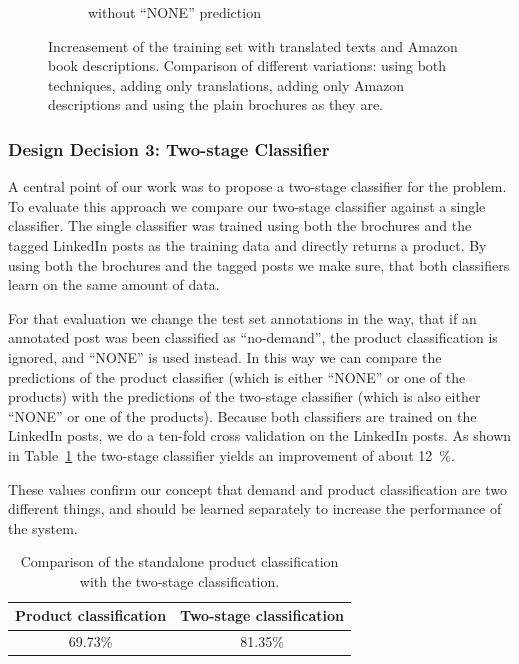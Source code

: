 \begin{figure}[h!]
\begin{subfigure}[t]{0.5\textwidth}
		\caption{without ``NONE'' prediction}
	\end{subfigure}
	\caption{Increasement of the training set with translated texts and Amazon book descriptions. Comparison of different variations: using both techniques, adding only translations, adding only Amazon descriptions and using the plain brochures as they are.}
	\label{fig:product_translate_amazon}
\end{figure}

\subsubsection{Design Decision 3: Two-stage Classifier}
\label{sub:two_stage_classifier}

A central point of our work was to propose a two-stage classifier for the \nto problem.
To evaluate this approach we compare our two-stage classifier against a single classifier.
The single classifier was trained using both the brochures and the tagged LinkedIn posts as the training data and directly returns a product.
By using both the brochures and the tagged posts we make sure, that both classifiers learn on the same amount of data.

For that evaluation we change the test set annotations in the way, that if an annotated post was been classified as ``no-demand'', the product classification is ignored, and ``NONE'' is used instead.
In this way we can compare the predictions of the product classifier (which is either ``NONE'' or one of the products) with the predictions of the two-stage classifier (which is also either ``NONE'' or one of the products).
Because both classifiers are trained on the LinkedIn posts, we do a ten-fold cross validation on the LinkedIn posts.
As shown in Table~\ref{table:two_stage_eval} the two-stage classifier yields an improvement of about 12~\%.

These values confirm our concept that demand and product classification are two different things, and should be learned separately to increase the performance of the system.

\begin{table}
	\centering
	\begin{tabular}{c|c}
		\hline
		Product classification & Two-stage classification \\
		\hline \hline
		69.73\% & 81.35\% \\
		\hline
	\end{tabular}
	\caption{Comparison of the standalone product classification with the two-stage classification.}
	\label{table:two_stage_eval}
\end{table}
